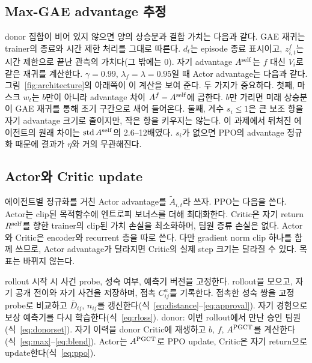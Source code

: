 \documentclass[10pt,twocolumn,letterpaper]{article}
\begin{document}
\subsection{Max-GAE advantage 추정}
donor 집합이 비어 있지 않으면 양의 상승분과 결합 가치는 다음과 같다.
\MaxEquation
GAE 재귀는 trainer의 종료와 시간 제한 처리를 그대로 따른다.
\GAEEquation
$d_t$는 episode 종료 표시이고, $z^f_{i,t}$는 시간 제한으로 끝난 관측의 가치다(그 밖에는 0). 자기 advantage $A^{\rm self}$는 $f$ 대신 $V_i$로 같은 재귀를 계산한다. $\gamma=0.99$, $\lambda_f=\lambda=0.95$일 때 Actor advantage는 다음과 같다.
\BlendEquation
그림~\ref{fig:architecture}의 아래쪽이 이 계산을 보여 준다. 두 가지가 중요하다. 첫째, 마스크 $w_t$는 $b$만이 아니라 advantage 차이 $A^f-A^{\rm self}$에 곱한다. $b$만 가리면 미래 상승분이 GAE 재귀를 통해 초기 구간으로 새어 들어온다. 둘째, 계수 $s_i\le1$은 큰 보조 항을 자기 advantage 크기로 줄이지만, 작은 항을 키우지는 않는다. 이 과제에서 뒤처진 에이전트의 원래 차이는 $\operatorname{std}A^{\rm self}$의 2.6--12배였다. $s_i$가 없으면 PPO의 advantage 정규화 때문에 결과가 $\eta$와 거의 무관해진다.

\subsection{Actor와 Critic update}
에이전트별 정규화를 거친 Actor advantage를 $\widetilde A_{i,t}$라 쓰자. PPO는 다음을 쓴다.
\PPOEquation
Actor는 clip된 목적함수에 엔트로피 보너스를 더해 최대화한다. Critic은 자기 return $R^{\rm self}$를 향한 trainer의 clip된 가치 손실을 최소화하며, 팀원 증류 손실은 없다. Actor와 Critic은 encoder와 recurrent 층을 따로 쓴다. 다만 gradient norm clip 하나를 함께 쓰므로, Actor advantage가 달라지면 Critic의 실제 step 크기는 달라질 수 있다. 목표는 바뀌지 않는다.

\begin{algorithm}[tb]
\caption{에이전트 $i$의 PGCT update 한 번}
\label{alg:pgct}
\begin{algorithmic}[1]
\STATE rollout 시작 시 사건 probe, 성숙 여부, 예측기 버전을 고정한다.
\STATE rollout을 모으고, 자기 공개 전이와 자기 사건을 저장하며, 접촉 $C^u_{ij}$를 기록한다.
\STATE 접촉한 성숙 쌍을 고정 probe로 비교하고 $\bar D_{ij}$, $n_{ij}$를 갱신한다(식~\ref{eq:distance}--\ref{eq:approval}).
\STATE 자기 경험으로 보상 예측기를 다시 학습한다(식~\ref{eq:rloss}).
\ENDIF
\STATE donor: 이번 rollout에서 만난 승인 팀원(식~\ref{eq:donorset}).
\STATE 자기 이력을 donor Critic에 재생하고 $b$, $f$, $A^{\rm PGCT}$를 계산한다(식~\ref{eq:max}--\ref{eq:blend}).
\STATE Actor는 $A^{\rm PGCT}$로 PPO update, Critic은 자기 return으로 update한다(식~\ref{eq:ppo}).
\end{algorithmic}
\end{algorithm}
\end{document}
